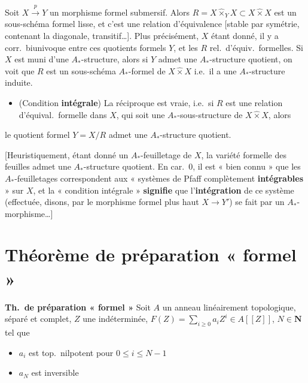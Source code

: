 \documentclass[11pt,a4paper]{article}
\begin{document}
\struck{\ill{}} Soit $X \xrightarrow{p} Y$ un morphisme formel submersif. Alors
$R = X \mathbin{\widehat{\times}_Y} X \subset X \mathbin{\widehat{\times}} X$
est un sous-schéma formel lisse, et c'est une relation d'équivalence [stable
par symétrie, contenant la diagonale, transitif\ldots]. 
Plus précisément, $X$ étant donné, il y a corr.\ biunivoque entre ces quotients
formels $Y$, et les $R$ rel.\ d'équiv.\ formelles. Si $X$ est muni d'une
$A_*$-structure, alors si $Y$ admet une $A_*$-structure quotient, on voit que
$R$ est un sous-schéma $A_*$-formel de $X \mathbin{\widehat{\times}} X$ i.e.\ il
a une $A_*$-structure induite.

\begin{itemize}
  \item[f)] (Condition \textbf{intégrale}) La réciproque est vraie, i.e.\ si
    $R$ est une relation d'équival.\ formelle dans $X$, qui soit une
    $A_*$-sous-structure de $X \mathbin{\widehat{\times}} X$, alors
\end{itemize}


le quotient formel $Y = X/R$ admet une $A_*$-structure quotient.

[Heuristiquement, étant donné un $A_*$-feuilletage de $X$, la variété formelle
des feuilles admet une $A_*$-structure quotient. En car.\ $0$, il est « bien
connu » que les $A_*$-feuilletages correspondent aux « systèmes de Pfaff
complètement \textbf{intégrables} » sur $X$, et la « condition intégrale »
\textbf{signifie} que l'\textbf{intégration} de ce système (effectuée, disons,
par le morphisme formel plus haut $X \to Y'$) se fait par un
$A_*$-morphisme\ldots]


\section{Théorème de préparation « formel »}



\textbf{Th.\ de préparation « formel »} Soit $A$ un anneau linéairement
topologique, séparé et complet, $Z$ une indéterminée,
$F(Z) = \sum_{i \geq 0} a_i Z^i \in A[[Z]]$, $N \in \mathbf{N}$ tel que

\begin{itemize}
  \item[(i)] $a_i$ est top.\ nilpotent pour $0 \leq i \leq N-1$
  \item[(ii)] $a_N$ est inversible
\end{itemize}
\end{document}
